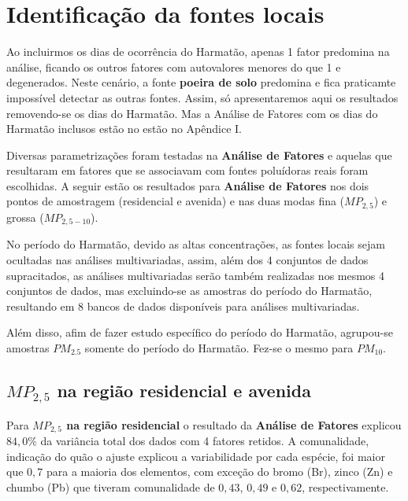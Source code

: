 \section{Identificação da fontes locais}

Ao incluirmos os dias de ocorrência do Harmatão, apenas 1 fator
predomina na análise, ficando os outros fatores com autovalores
menores do que 1 e degenerados. Neste cenário, a fonte 
\textbf{poeira de solo} predomina e fica praticamte impossível
detectar as outras fontes. Assim, só apresentaremos aqui os resultados 
removendo-se os dias do Harmatão. Mas a Análise de Fatores com os
dias do Harmatão inclusos estão no estão no Apêndice I.

Diversas parametrizações foram testadas na \textbf{Análise de Fatores}
e aquelas que resultaram em fatores que se associavam com fontes poluídoras
reais foram escolhidas. A seguir estão os resultados para 
\textbf{Análise de Fatores} nos dois pontos de amostragem 
(residencial e avenida) e nas duas modas
fina ($MP_{2,5}$) e grossa ($MP_{2,5-10}$).

No período do Harmatão, devido as altas concentrações, as fontes locais sejam 
ocultadas nas análises multivariadas, assim, além dos 4 conjuntos de dados 
supracitados, as análises multivariadas serão também realizadas nos mesmos 4 
conjuntos de dados, mas excluindo-se as amostras do período do Harmatão, 
resultando em 8 bancos de dados disponíveis para análises multivariadas. 

Além disso, afim de fazer estudo específico do período do 
Harmatão, agrupou-se amostras $PM_{2.5}$ somente do período do Harmatão. 
Fez-se o mesmo para $PM_{10}$.  



\subsection{$MP_{2,5}$ na região residencial e avenida}

Para \textbf{$MP_{2,5}$ na região residencial} o resultado da 
\textbf{Análise de Fatores}  explicou $84,0\%$ da variância total 
dos dados com 4 fatores retidos.
A comunalidade, indicação do quão o ajuste explicou a variabilidade por 
cada espécie, foi maior que $0,7$ para a maioria dos elementos,
com exceção do bromo (Br), zinco (Zn) e chumbo (Pb) que tiveram comunalidade 
de $0,43$, $0,49$ e $0,62$, respectivamente.

